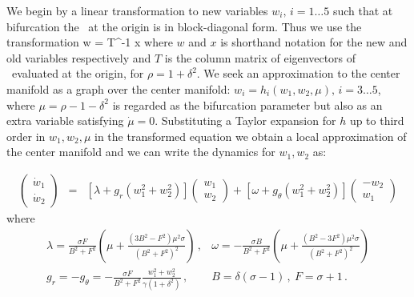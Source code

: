 \documentclass[letter,10pt]{article}
\begin{document}
We begin by a linear transformation to new variables $w_i,\, i=1\ldots 5$ such that at bifurcation
the \stabmat\ at the origin is in block-diagonal form. Thus we use the transformation
\beq
	w = T^{-1} x
\eeq
where $w$ and $x$ is shorthand notation for the new and old variables respectively and $T$ is the column matrix of
eigenvectors of \stabmat\ evaluated at the origin, for $\rho=1+\delta^2$. We seek an approximation to the center manifold
as a graph over the center manifold: $w_i = h_i(w_1,w_2,\mu),\, i=3\ldots5$, where $\mu=\rho-1-\delta^2$ is regarded
as the bifurcation parameter but also as an extra variable satisfying $\dot{\mu}=0$. Substituting a Taylor expansion for $h$
up to third order in $w_1,w_2,\mu$ in the transformed equation we obtain a local approximation of the center manifold
and we can write the dynamics for $w_1,w_2$ as:

\begin{eqnarray}
 \left(\begin{array}{c} \dot{w}_1 \\ \dot{w}_2  \end{array}\right) & = & \left[\lambda + g_r(w_1^2+w_2^2) \right]\left(\begin{array}{c} w_1 \\ w_2  \end{array}\right) + \left[\omega + g_\theta(w_1^2+w_2^2) \right] \left(\begin{array}{c} -w_2 \\ w_1 \end{array}\right)
\end{eqnarray}
where
\[\begin{array}{cc}
	\lambda = \frac{ \sigma F}{B^2+F^2} \left(\mu +\frac{\left(3 B^2-F^2\right) \mu ^2 \sigma }{\left(B^2+F^2\right)^2}\right)\,, &
		\omega = -\frac{ \sigma B}{B^2+F^2}\left(\mu +\frac{\left(B^2-3 F^2\right) \mu ^2 \sigma }{\left(B^2+F^2\right)^2}\right) \\
	g_r= -g_\theta= -\frac{ \sigma F}{B^2+F^2} \frac{w_1^2+w_2^2}{\gamma\left(1+\delta ^2\right)}\,,  & B = \delta(\sigma-1)\,,\ F=\sigma+1\,.  \\
\end{array}
\]
\end{document}
